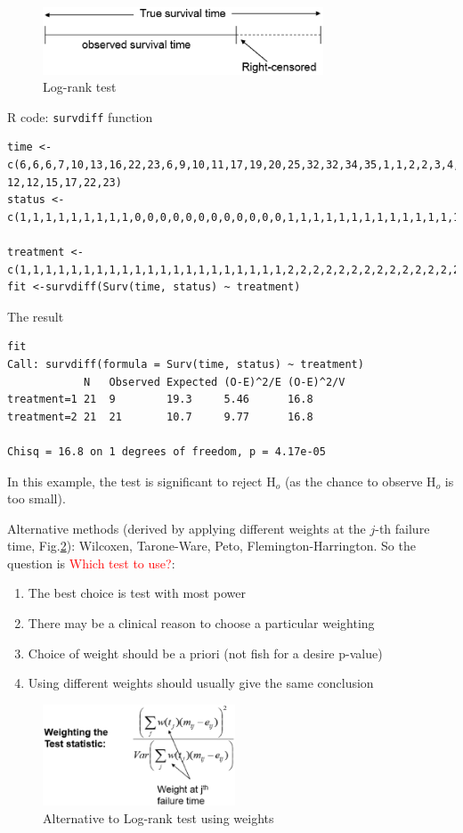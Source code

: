 \begin{figure}[hbt]
  \centerline{\includegraphics[height=2cm,
    angle=0]{./images/logrank_info.eps}}
  \caption{Log-rank test}
\label{fig:logrank_info}
\end{figure}

R code: \verb!survdiff! function
\begin{verbatim}
time <-c(6,6,6,7,10,13,16,22,23,6,9,10,11,17,19,20,25,32,32,34,35,1,1,2,2,3,4,4,5,5,8,8,8,8,11,11,
12,12,15,17,22,23)
status <-c(1,1,1,1,1,1,1,1,1,0,0,0,0,0,0,0,0,0,0,0,0,1,1,1,1,1,1,1,1,1,1,1,1,1,1,1,1,1,1,1,1,1)

treatment <-c(1,1,1,1,1,1,1,1,1,1,1,1,1,1,1,1,1,1,1,1,1,2,2,2,2,2,2,2,2,2,2,2,2,2,2,2,2,2,2,2,2,2)
fit <-survdiff(Surv(time, status) ~ treatment)
\end{verbatim}
The result
\begin{verbatim}
fit
Call: survdiff(formula = Surv(time, status) ~ treatment)
            N   Observed Expected (O-E)^2/E (O-E)^2/V
treatment=1 21  9        19.3     5.46      16.8
treatment=2 21  21       10.7     9.77      16.8

Chisq = 16.8 on 1 degrees of freedom, p = 4.17e-05
\end{verbatim}
In this example, the test is significant to reject H$_o$ (as the chance to
observe H$_o$ is too small).

Alternative methods (derived by applying different weights at the $j$-th
failure time, Fig.\ref{fig:logrank_weight}): Wilcoxen, Tarone-Ware, Peto,
Flemington-Harrington. So the question is \textcolor{red}{Which test to use?}: 
\begin{enumerate}
  \item The best choice is test with most power
  \item There may be a clinical reason to choose a particular weighting
  \item Choice of weight should be a priori (not fish for a desire p-value)
  \item Using different weights should usually give the same conclusion
\end{enumerate}

\begin{figure}[hbt]
  \centerline{\includegraphics[height=3cm,
    angle=0]{./images/logrank_weight.eps}}
  \caption{Alternative to Log-rank test using weights}
\label{fig:logrank_weight}
\end{figure}

